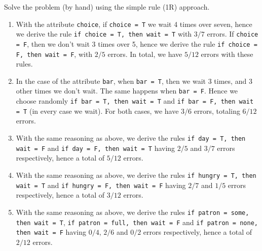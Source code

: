 \documentclass[fontsize=12pt, usenames, dvipsnames, headinclude, headsepline, footinclude, footsepline]{scrartcl}
\title{\normalfont{\bfseries{Machine Learning: Homework 1}}}
\author{Laurent \textsc{Hayez}}
\date{\today}
\begin{document}
\renewcommand{\labelitemi}{\textbullet}



\maketitle




\begin{exo}
  Solve the problem (by hand) using the simple rule (1R) approach.
\end{exo}

  \begin{sol}
    \begin{enumerate}
    \item With the attribute \texttt{choice}, if \texttt{choice = T} we wait 4 times over seven, hence we
      derive the rule \texttt{if choice = T, then wait = T} with $3/7$ errors. If \texttt{choice = F}, then we
      don't wait 3 times over 5, hence we derive the rule \texttt{if choice = F, then wait = F}, with $2/5$
      errors. In total, we have $5/12$ errors with these rules.

    \item In the case of the attribute \texttt{bar}, when \texttt{bar = T}, then we wait 3 times, and 3 other
      times we don't wait. The same happens when \texttt{bar = F}. Hence we choose randomly \texttt{if bar =
      T, then wait = T} and \texttt{if bar = F, then wait = T} (in every case we wait). For both cases, we
      have $3/6$ errors, totaling $6/12$ errors.
    
    \item With the same reasoning as above, we derive the rules \texttt{if day = T, then wait = F} and
      \texttt{if day = F, then wait = T} having $2/5$ and $3/7$ errors respectively, hence a total of $5/12$
      errors.

    \item With the same reasoning as above, we derive the rules \texttt{if hungry = T, then wait = T} and
      \texttt{if hungry = F, then wait = F} having $2/7$ and $1/5$ errors respectively, hence a total of $3/12$
      errors.

    \item With the same reasoning as above, we derive the rules \texttt{if patron = some, then wait = T},
      \texttt{if patron = full, then wait = F} and \texttt{if patron = none, then wait = F} having $0/4$,
      $2/6$ and $0/2$ errors respectively, hence a total of $2/12$ errors.


\end{enumerate}
\end{sol}
\end{document}
